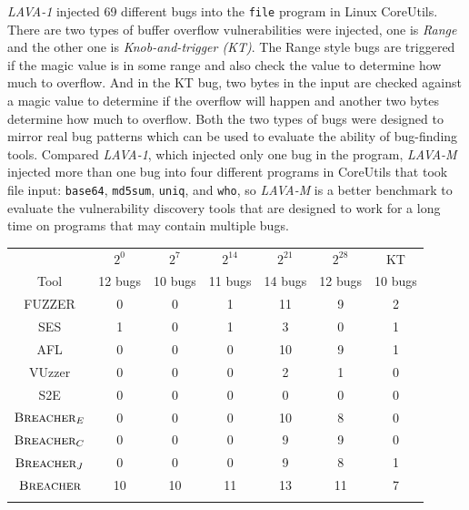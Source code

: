 \documentclass{cta-author}
\newcommand{\prototype}{\textsc{Breacher} }
\begin{document}
\textit{LAVA-1} injected 69 different bugs into the \texttt{file} program 
in Linux CoreUtils. There are two types of buffer overflow vulnerabilities 
were injected, one is \emph{Range} and the other one is 
\emph{Knob-and-trigger (KT)}. The Range style bugs are triggered if the 
magic value is in some range and also check the value to determine how much 
to overflow. And in the KT bug, two bytes in the input are checked against 
a magic value to determine if the overflow will happen and another two bytes 
determine how much to overflow. Both the two types of bugs were designed to 
mirror real bug patterns which can be used to evaluate the ability of 
bug-finding tools. Compared \textit{LAVA-1}, which injected only one bug 
in the program, \textit{LAVA-M} injected more than one bug into four 
different programs in CoreUtils that took file input: \texttt{base64}, 
\texttt{md5sum}, \texttt{uniq}, and \texttt{who}, so \textit{LAVA-M} is a 
better benchmark to evaluate the vulnerability discovery tools that are 
designed to work for a long time on programs that may contain multiple bugs.

\begin{table}[!b]
	{\begin{tabular*}{10pc}{@{\extracolsep{\fill}}ccccccc@{\extracolsep{\fill}}}\toprule
			& $2^0$ & $2^7$  & $2^{14}$ & $2^{21}$ & $2^{28}$ & KT \\
			Tool   & 12 bugs & 10 bugs & 11 bugs & 14 bugs & 12 bugs & 10 bugs\\
			\midrule
			FUZZER 					& 0   & 0   & 1    & 11    & 9     & 2  \\
			SES	        			& 1   & 0   & 1    & 3     & 0     & 1  \\
			AFL		    			& 0   & 0   & 0    & 10    & 9     & 1   \\
			VUzzer      			& 0	  & 0   & 0	   & 2     & 1	   & 0   \\
			S2E						& 0   & 0   & 0    & 0     & 0     & 0   \\
			$\prototype_{E}$ 		& 0   & 0   & 0    & 10    & 8     & 0   \\
			$\prototype_{C}$ 		& 0   & 0   & 0    & 9     & 9     & 0   \\
			$\prototype_{J}$ 		& 0   & 0   & 0    & 9     & 8     & 1   \\
			$\prototype$			& 10  & 10  & 11   & 13    & 11    & 7   \\
			\botrule
		\end{tabular*}}{}
	\end{table}
	
\end{document}
